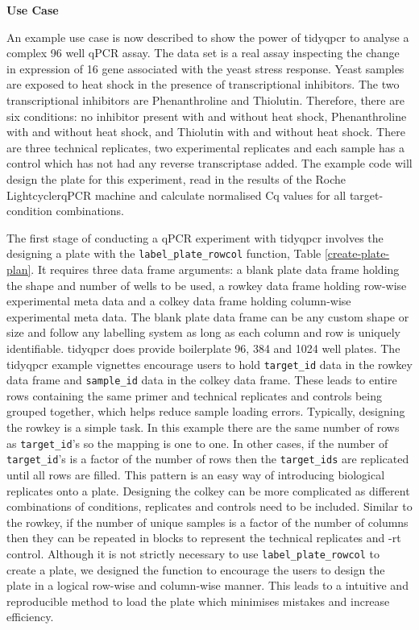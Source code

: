 \documentclass[../main.tex]{subfiles}
\begin{document}
\textbf{Use Case}

\captionsetup[table]{list=no}

An example use case is now described to show the power of tidyqpcr to analyse a complex 96 well qPCR assay.
The data set is a real assay inspecting the change in expression of 16 gene associated with the yeast stress response.
Yeast samples are exposed to heat shock in the presence of transcriptional inhibitors.
The two transcriptional inhibitors are Phenanthroline and Thiolutin.
Therefore, there are six conditions: no inhibitor present with and without heat shock, Phenanthroline with and without heat shock, and Thiolutin with and without heat shock.
There are three technical replicates, two experimental replicates and each sample has a control which has not had any reverse transcriptase added.
The example code will design the plate for this experiment, read in the results of the Roche LightcyclerqPCR machine and calculate normalised Cq values for all target-condition combinations.

The first stage of conducting a qPCR experiment with tidyqpcr involves the designing a plate with the \lstinline{label_plate_rowcol} function, Table  \ref{create-plate-plan}. 
It requires three data frame arguments: a blank plate data frame holding the shape and number of wells to be used, a rowkey data frame holding row-wise experimental meta data and a colkey data frame holding column-wise experimental meta data.
The blank plate data frame can be any custom shape or size and follow any labelling system as long as each column and row is uniquely identifiable. 
tidyqpcr does provide boilerplate 96, 384 and 1024 well plates.
The tidyqpcr example vignettes encourage users to hold \lstinline{target_id} data in the rowkey data frame and \lstinline{sample_id} data in the colkey data frame.
These leads to entire rows containing the same primer and technical replicates and controls being grouped together, which helps reduce sample loading errors.
Typically, designing the rowkey is a simple task.
In this example there are the same number of rows as \lstinline{target_id}'s so the mapping is one to one.
In other cases, if the number of \lstinline{target_id}'s is a factor of the number of rows then the \lstinline{target_ids} are replicated until all rows are filled.
This pattern is an easy way of introducing biological replicates onto a plate. 
Designing the colkey can be more complicated as different combinations of conditions, replicates and controls need to be included.
Similar to the rowkey, if the number of unique samples is a factor of the number of columns then they can be repeated in blocks to represent the technical replicates and -rt control.
Although it is not strictly necessary to use \lstinline{label_plate_rowcol} to create a plate, we designed the function to encourage the users to design the plate in a logical row-wise and column-wise manner.
This leads to a intuitive and reproducible method to load the plate which minimises mistakes and increase efficiency. 
\end{document}
